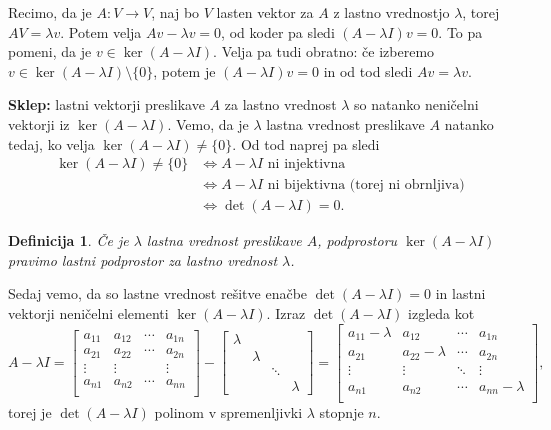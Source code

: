 \documentclass[10pt, a4paper]{article}
\newtheorem{defi}{Definicija}[section]
\newenvironment{noticeB}{%
  \tcolorbox[%
  notitle,
  empty,
  enhanced,  %
  breakable,
  coltext=black,
  colback=white, 
  fontupper=\rmfamily,
  parbox=false,
  noparskip,
  sharp corners,
  boxrule=-1pt,  %
  frame hidden,
  left=7pt,  %
  right=7pt,
  top=5pt,
  bottom=5pt,
  before skip=2.5ex plus 2pt,
  after skip=2.5ex plus 2pt,
  borderline west = {1.5pt}{-0.1pt}{blue!30!black}, %
  overlay unbroken and last={%
    \draw[color=black, line width=1.25pt]
    ($(frame.south west)+(1.pt, -0.1pt)$) -- ++(2em, 0);
  }
  ]}
{\endtcolorbox}
\newenvironment{definicija}{\begin{defi}\begin{noticeB}}{%
    \end{noticeB}\end{defi}}
\begin{document}
Recimo, da je $A: V \rightarrow V$, naj bo $V$ lasten vektor za $A$ z lastno vrednostjo $\lambda$, torej $AV = \lambda v$.
Potem velja $Av - \lambda v = 0$, od koder pa sledi $(A - \lambda I)v = 0$.
To pa pomeni, da je $v \in \ker (A - \lambda I)$.
Velja pa tudi obratno: če izberemo $v \in \ker (A - \lambda I) \setminus \{0\}$, potem je $(A - \lambda I)v = 0$ in od tod sledi $Av = \lambda v$.

\textbf{Sklep:} lastni vektorji preslikave $A$ za lastno vrednost $\lambda$ so natanko neničelni vektorji iz $\ker(A - \lambda I)$.
Vemo, da je $\lambda$ lastna vrednost preslikave $A$ natanko tedaj, ko velja $\ker (A - \lambda I) \neq \{0\}$. Od tod naprej pa sledi
\begin{align*}
    \ker (A - \lambda I) \neq \{0\} &\iff \text{$A - \lambda I$ ni injektivna}\\
    &\iff \text{$A - \lambda I$ ni bijektivna (torej ni obrnljiva)}\\
    &\iff \det (A - \lambda I) = 0.
\end{align*}

\vspace{-7mm}
\begin{definicija}
    Če je $\lambda$ lastna vrednost preslikave $A$, podprostoru $\ker (A - \lambda I)$
    pravimo lastni podprostor za lastno vrednost $\lambda$.
\end{definicija}

Sedaj vemo, da so lastne vrednost rešitve enačbe $\det(A - \lambda I) = 0$ in lastni vektorji neničelni elementi $\ker (A - \lambda I)$.
Izraz $\det (A - \lambda I)$ izgleda kot 
$$A - \lambda I = \begin{bmatrix}
    a_{11} & a_{12} & \cdots & a_{1n}\\
    a_{21} & a_{22} & \cdots & a_{2n}\\
    \vdots & \vdots & & \vdots\\
    a_{n1} & a_{n2} & \cdots & a_{nn}\\
\end{bmatrix} - \begin{bmatrix}
    \lambda & & & \\
     & \lambda & & \\
     & & \ddots & \\
     & & & \lambda 
\end{bmatrix} = \begin{bmatrix}
    a_{11} - \lambda & a_{12} & \cdots & a_{1n}\\
    a_{21} & a_{22} - \lambda & \cdots & a_{2n}\\
    \vdots & \vdots & \ddots & \vdots\\
    a_{n1} & a_{n2} & \cdots & a_{nn} - \lambda\\
\end{bmatrix},$$
torej je $\det (A - \lambda I)$ polinom v spremenljivki $\lambda$ stopnje $n$.
\end{document}
